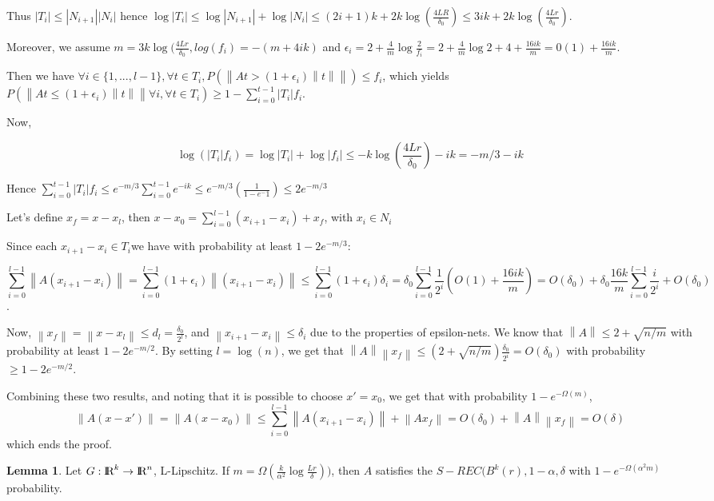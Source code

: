 \documentclass{article}
\newcommand\norm[1]{\left\lVert#1\right\rVert}
\def\R{\textrm{I\kern-0.21emR}}
\theoremstyle{definition}
\theoremstyle{lemma}
\newtheorem{lemma}{Lemma}[section]
\theoremstyle{theorem}
\begin{document}
Thus $|T_i| \leq | N_{i+1}||N_i| $ hence $\log |T_i| \leq \log | N_{i+1}| + \log |N_i| \leq (2i+1)k + 2k \log (\frac{4LR}{\delta_0}) \leq 3ik + 2k \log (\frac{4Lr}{\delta_0})$.

Moreover, we assume $m = 3k \log (\frac{4Lr}{\delta_0}, log(f_i) = -(m + 4ik)$ and $\epsilon_i = 2 + \frac{4}{m} \log \frac{2}{f_i} = 2 + \frac{4}{m} \log 2 + 4 + \frac{16ik}{m} = 0(1) + \frac{16 ik}{m}$.

Then we have $\forall i \in \{ 1, ..., l-1 \}, \forall t \in T_i, P(\norm{At > (1+\epsilon_i)\norm{t}}) \leq f_i$, which yields $P(\norm{At \leq (1+\epsilon_i)\norm{t}} \forall i, \forall t \in T_i) \geq 1 - \sum_{i=0}^{t-1} |T_i| f_i$.

Now, 

$$ \log (|T_i|f_i) = \log|T_i| + \log|f_i| \leq -k \log (\frac{4Lr}{\delta_0}) - ik = -m/3 - ik$$

Hence $ \sum_{i=0}^{t-1} |T_i| f_i \leq e^{-m/3}  \sum_{i=0}^{t-1} e^{-ik} \leq e^{-m/3}(\frac{1}{1-e^-1}) \leq 2e^{-m/3}$

Let's define $x_f = x - x_l$, then $x-x_0 = \sum_{i=0}^{l-1} (x_{i+1} - x_i) + x_f$, with $x_i \in N_i$

Since each $x_{i+1} - x_i \in T_i$we have with probability at least $1-2e^{-m/3}$:

$$ \sum_{i=0}^{l-1} \norm{A(x_{i+1} - x_i)} = \sum_{i=0}^{l-1} (1+\epsilon_i)\norm{(x_{i+1} - x_i)} \leq \sum_{i=0}^{l-1} (1+\epsilon_i)\delta_i  = \delta_0 \sum_{i=0}^{l-1} \frac{1}{2^i}(O(1) + \frac{16ik}{m}) = O(\delta_0) + \delta_0\frac{16k}{m} \sum_{i=0}^{l-1} \frac{i}{2^i} + O(\delta_0)$$.

Now, $\norm{x_f} = \norm{x-x_l} \leq d_l = \frac{\delta_0}{2^l}$, and $\norm{x_{i+1} - x_i} \leq \delta_i$ due to the properties of epsilon-nets. We know that $\norm{A} \leq 2 + \sqrt{n/m}$ with probability at least $1 - 2 e^{-m/2}$. By setting $l = \log(n)$, we get that $\norm{A} \norm{x_f} \leq (2 + \sqrt{n/m})\frac{\delta_0}{2^i} = O(\delta_0) $ with probability $\geq 1 - 2e^{-m/2}.$

Combining these two results, and noting that it is possible to choose $x' = x_0$, we get that with probability $1 - e^{-\Omega(m)}$,
$$ \norm{ A(x-x')} = \norm{ A(x-x_0)} \leq \sum_{i=0}^{l-1} \norm{ A(x_{i+1}-x_i)} + \norm{Ax_f} = O(\delta_0) + \norm{A} \norm{x_f} = O(\delta)$$ which ends the proof.



\begin{lemma}
Let $G : \R^k \rightarrow \R^n$, L-Lipschitz. If $m = \Omega(\frac{k}{\alpha^2} \log \frac{Lr}{\delta}))$, then $A$ satisfies the $S-REC(B^k (r), 1-\alpha, \delta$ with $1-e^{-\Omega(\alpha^2 m)}$ probability.

\end{lemma}
\end{document}
